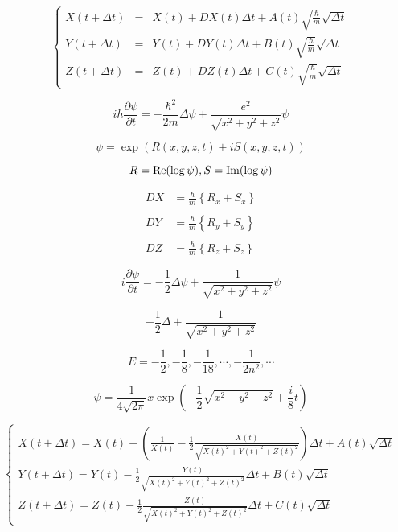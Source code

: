 $$
\left\{
\begin{array}{lll}
X(t+\varDelta t)&=&X(t)+DX(t)\varDelta t+A(t)\sqrt{\frac{\hbar}{m}}\sqrt{\varDelta t} \\
Y(t+\varDelta t)&=&Y(t)+DY(t)\varDelta t+B(t)\sqrt{\frac{\hbar}{m}}\sqrt{\varDelta t} \\
Z(t+\varDelta t)&=&Z(t)+DZ(t)\varDelta t+C(t)\sqrt{\frac{\hbar}{m}}\sqrt{\varDelta t}
\end{array}
\right.
$$

$$
i h \frac{\partial \psi}{\partial t}=-\frac{\hbar^2}{2m}\varDelta\psi+\frac{e^2}{\sqrt{x^2+y^2+z^2}}\psi
$$

$$
\psi=\exp(R(x,y,z,t)+iS(x,y,z,t))
$$

$$
R={\rm Re}(\log\psi), S={\rm Im}(\log\psi)
$$

$$
\begin{array}{ll}
DX&=\frac{\hbar}{m}\left\{R_{x}+S_{x}\right\} \\
\\
DY&=\frac{\hbar}{m}\left\{R_{y}+S_{y}\right\} \\
\\
DZ&=\frac{\hbar}{m}\left\{R_{z}+S_{z}\right\} 
\end{array}
$$

$$
i \frac{\partial \psi}{\partial t}=-\frac{1}{2}\varDelta\psi+\frac{1}{\sqrt{x^2+y^2+z^2}}\psi
$$

$$
-\frac{1}{2}\varDelta+\frac{1}{\sqrt{x^2+y^2+z^2}}
$$

$$
E=-\frac{1}{2},-\frac{1}{8},-\frac{1}{18},\cdots,-\frac{1}{2n^{2}},\cdots
$$

$$
\psi=\frac{1}{4\sqrt{2\pi}}x\exp\left(-\frac{1}{2}\sqrt{x^2+y^{2}+z^{2}}+\frac{i}{8}t\right)
$$

$$
\left\{
\begin{array}{l}
X(t+\Delta t)=\displaystyle X(t)+\left(\frac{1}{X(t)}-\frac{1}{2}\frac{X(t)}{\sqrt{X(t)^{2}+Y(t)^{2}+Z(t)^{2}}}\right)\Delta t+A(t)\sqrt{\Delta t} \\
Y(t+\Delta t)=\displaystyle Y(t)-\frac{1}{2}\frac{Y(t)}{\sqrt{X(t)^{2}+Y(t)^{2}+Z(t)^{2}}}\Delta t+B(t)\sqrt{\Delta t} \\
Z(t+\Delta t)=\displaystyle Z(t)-\frac{1}{2}\frac{Z(t)}{\sqrt{X(t)^{2}+Y(t)^{2}+Z(t)^{2}}}\Delta t+C(t)\sqrt{\Delta t}
\end{array}
\right.
$$

